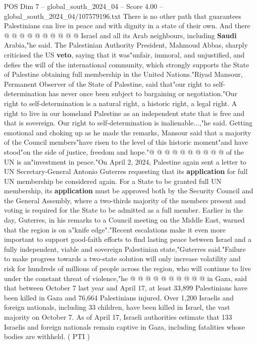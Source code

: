 \begin{textsample}{POS Dim 7 – global\_south\_2024\_04 – Score 4.00 – global\_south\_2024\_04/107579196.txt}
There is no other path that guarantees Palestinians can live in peace and with dignity in a state of their own.
And there @ @ @ @ @ @ @ @ @ @ Israel and all its Arab neighbours, including \textbf{Saudi} Arabia,"he said.
The Palestinian Authority President, Mahmoud Abbas, sharply criticised the US \textbf{veto}, saying that it was"unfair, immoral, and unjustified, and defies the will of the international community, which strongly supports the State of Palestine obtaining full membership in the United Nations."Riyad Mansour, Permanent Observer of the State of Palestine, said that"our right to self-determination has never once been subject to bargaining or negotiation."Our right to self-determination is a natural right, a historic right, a legal right.
A right to live in our homeland Palestine as an independent state that is free and that is sovereign.
Our right to self-determination is inalienable...,"he said.
Getting emotional and choking up as he made the remarks, Mansour said that a majority of the Council members"have risen to the level of this historic moment"and have stood"on the side of justice, freedom and hope."@ @ @ @ @ @ @ @ @ @ of the UN is an"investment in peace."On April 2, 2024, Palestine again sent a letter to UN Secretary-General Antonio Guterres requesting that its \textbf{application} for full UN membership be considered again.
For a State to be granted full UN membership, its \textbf{application} must be approved both by the Security Council and the General Assembly, where a two-thirds majority of the members present and voting is required for the State to be admitted as a full member.
Earlier in the day, Guterres, in his remarks to a Council meeting on the Middle East, warned that the region is on a"knife edge"."Recent escalations make it even more important to support good-faith efforts to find lasting peace between Israel and a fully independent, viable and sovereign Palestinian state,"Guterres said."Failure to make progress towards a two-state solution will only increase volatility and risk for hundreds of millions of people across the region, who will continue to live under the constant threat of violence,"he @ @ @ @ @ @ @ @ @ @ in Gaza, said that between October 7 last year and April 17, at least 33,899 Palestinians have been killed in Gaza and 76,664 Palestinians injured.
Over 1,200 Israelis and foreign nationals, including 33 children, have been killed in Israel, the vast majority on October 7.
As of April 17, Israeli authorities estimate that 133 Israelis and foreign nationals remain captive in Gaza, including fatalities whose bodies are withheld. ( PTI )

\end{textsample}
